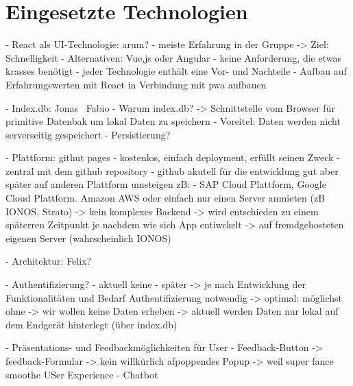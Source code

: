 \section{Eingesetzte Technologien}
- React als UI-Technologie: arum?
	- meiste Erfahrung in der Gruppe -> Ziel: Schnelligkeit
	- Alternativen: Vue,js oder Angular
	- keine Anforderung, die etwas krasses benötigt
	- jeder Technologie enthält eine Vor- und Nachteile
	- Aufbau auf Erfahrungswerten mit React in Verbindung mit pwa aufbauen
	
	
- Index.db: Jonas \ Fabio
	- Warum index.db? -> Schnittstelle vom Browser für primitive Datenbak um lokal Daten zu speichern
	- Voreitel: Daten werden nicht serverseitig gespeichert
	- Persistierung?
	
	
	
- Plattform: githut pages
	- kostenlos, einfach deployment, erfüllt seinen Zweck
	- zentral mit dem github repository
	- github akutell für die entwicklung gut aber später auf anderen Plattform umsteigen zB:
	- SAP Cloud Plattform, Google Cloud Plattform. Amazon AWS oder einfach nur einen Server anmieten (zB IONOS, Strato) -> kein komplexes Backend -> wird entschieden zu einem späterren Zeitpunkt je nachdem wie sich App entiwckelt -> auf fremdgehosteten eigenen Server (wahrscheinlich IONOS) 

- Architektur: Felix?




- Authentifizierung? 
	- aktuell keine
	- später -> je nach Entwicklung der Funktionalitäten und Bedarf Authentifizierung notwendig -> optimal: möglichst ohne -> wir wollen keine Daten erheben -> aktuell werden Daten nur lokal auf dem Endgerät hinterlegt (über index.db)
	
	
	
	
- Präsentations- und Feedbackmöglichkeiten für User
	- Feedback-Button -> feedback-Formular -> kein willkürlich afpoppendes Popup -> weil super fance smoothe USer Experience
	- Chatbot
	


